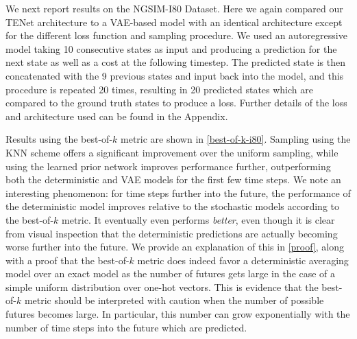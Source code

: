 \documentclass{article}
\newcommand{\modelname}{TENet }
\begin{document}
We next report results on the NGSIM-I80 Dataset.
Here we again compared our \modelname architecture to a VAE-based model with an identical architecture except for the different loss function and sampling procedure.
We used an autoregressive model taking 10 consecutive states as input and producing a prediction for the next state as well as a cost at the following timestep.
The predicted state is then concatenated with the 9 previous states and input back into the model, and this procedure is repeated 20 times, resulting in 20 predicted states which are compared to the ground truth states to produce a loss.
Further details of the loss and architecture used can be found in the Appendix.

Results using the best-of-$k$ metric are shown in \cref{best-of-k-i80}.
Sampling using the KNN scheme offers a significant improvement over the uniform sampling, while using the learned prior network improves performance further, outperforming both the deterministic and VAE models for the first few time steps.
We note an interesting phenomenon: for time steps further into the future, the performance of the deterministic model improves relative to the stochastic models according to the best-of-$k$ metric.
It eventually even performs \emph{better}, even though it is clear from visual inspection that the deterministic predictions are actually becoming worse further into the future.
We provide an explanation of this in \cref{proof}, along with a proof that the best-of-$k$ metric does indeed favor a deterministic averaging model over an exact model as the number of futures gets large in the case of a simple uniform distribution over one-hot vectors.
This is evidence that the best-of-$k$ metric should be interpreted with caution when the number of possible futures becomes large.
In particular, this number can grow exponentially with the number of time steps into the future which are predicted.
\end{document}
